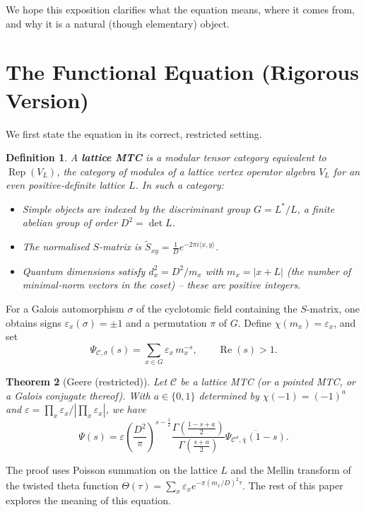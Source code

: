 \documentclass[12pt,a4paper]{article}
\newtheorem{theorem}{Theorem}[section]
\newtheorem{definition}[theorem]{Definition}
\theoremstyle{remark}
\begin{document}
We hope this exposition clarifies what the equation means, where it comes from, and why it is a natural (though elementary) object.

\section{The Functional Equation (Rigorous Version)}

We first state the equation in its correct, restricted setting.

\begin{definition}
  A \textbf{lattice MTC} is a modular tensor category equivalent to $\operatorname{Rep}(V_L)$, the category of modules of a lattice vertex operator algebra $V_L$ for an even positive‑definite lattice $L$. In such a category:
  \begin{itemize}
    \item Simple objects are indexed by the discriminant group $G = L^*/L$, a finite abelian group of order $D^2 = \det L$.
    \item The normalised $S$-matrix is $\tilde S_{xy} = \frac1D e^{-2\pi i\langle x,y\rangle}$.
    \item Quantum dimensions satisfy $d_x^2 = D^2 / m_x$ with $m_x = |x+L|$ (the number of minimal‑norm vectors in the coset) – these are positive integers.
  \end{itemize}
\end{definition}

For a Galois automorphism $\sigma$ of the cyclotomic field containing the $S$-matrix, one obtains signs $\varepsilon_x(\sigma)=\pm1$ and a permutation $\pi$ of $G$. Define $\chi(m_x)=\varepsilon_x$, and set
\[
\Psi_{\mathcal{C},\sigma}(s)=\sum_{x\in G}\varepsilon_x\, m_x^{-s},\qquad \operatorname{Re}(s)>1.
\]

\begin{theorem}[Geere (restricted)]
  Let $\mathcal{C}$ be a lattice MTC (or a pointed MTC, or a Galois conjugate thereof). With $a\in\{0,1\}$ determined by $\chi(-1)=(-1)^a$ and $\varepsilon=\prod_x\varepsilon_x/|\prod_x\varepsilon_x|$, we have
  \[
  \Psi(s)=\varepsilon\left(\frac{D^2}{\pi}\right)^{s-\frac12}
  \frac{\Gamma\!\left(\frac{1-s+a}{2}\right)}{\Gamma\!\left(\frac{s+a}{2}\right)}
  \overline{\Psi_{\mathcal{C}^{\sigma},\overline{\chi}}(1-s)}.
  \]
\end{theorem}

The proof uses Poisson summation on the lattice $L$ and the Mellin transform of the twisted theta function $\Theta(\tau)=\sum_x\varepsilon_x e^{-\pi(m_x/D)^2\tau}$. The rest of this paper explores the meaning of this equation.
\end{document}
